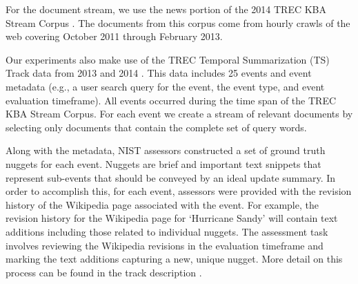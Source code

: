 For the document stream, we use the news portion of the
 2014 TREC KBA Stream Corpus \cite{frank2012building}.
The documents from this corpus come from hourly crawls of the web covering 
 October 2011 through February 2013. 


Our experiments also make use of the TREC Temporal Summarization (TS) Track
 data from 2013 and 2014 \cite{aslam2013trec}. 
This data includes 25 events and event metadata (e.g., a user
search query for the event, the event type, and event evaluation timeframe).  
All events occurred during the time span of the TREC KBA Stream Corpus.
For each event we create a stream of relevant documents by 
selecting only documents that contain the complete set 
of query words. 

Along with the metadata, NIST assessors constructed a set of ground truth nuggets for each event. 
Nuggets are brief and important text snippets that represent sub-events that should be conveyed
by an ideal update summary. %
In order
to accomplish this, for each event, assessors were provided with the
revision history of the Wikipedia page associated with the event.  
For example, 
the revision history for the Wikipedia page for `Hurricane Sandy' will 
contain text additions including those related to individual nuggets.  The assessment
task involves reviewing the Wikipedia revisions in the evaluation timeframe 
and marking the text additions capturing a new, unique nugget.  More detail
on this process can be found in the track description \cite{aslam2013trec}.


